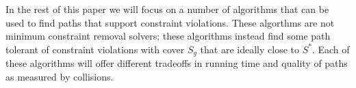 In the rest of this paper we will focus on a number of algorithms that can be used to find paths that support constraint violations. These algorthms are not minimum constraint removal solvers; these algorithms instead find some path tolerant of constraint violations with cover $S_g$ that are ideally close to $S^{*}$. Each of these algorithms will offer different tradeoffs in running time and quality of paths as measured by collisions. 
